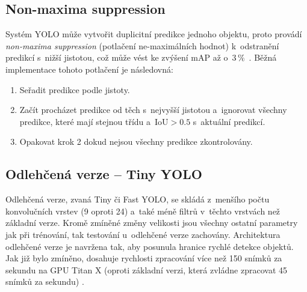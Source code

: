 \subsection*{Non-maxima suppression}
Systém YOLO může vytvořit duplicitní predikce jednoho objektu, proto provádí \emph{non-maxima suppression} (potlačení ne-maximálních hodnot) k~odstranění predikcí s~nižší jistotou, což může vést ke zvýšení mAP až o~$3\,\%$~\cite{yolov123}. Běžná implementace tohoto potlačení je následovná:

\begin{enumerate}
    \item Seřadit predikce podle jistoty.
    \item Začít procházet predikce od těch s~nejvyšší jistotou a~ignorovat všechny predikce, které mají stejnou třídu a~$\text{IoU} > 0.5$ s~aktuální predikcí.
    \item Opakovat krok 2 dokud nejsou všechny predikce zkontrolovány.
\end{enumerate}

\subsection*{Odlehčená verze -- Tiny YOLO}
\label{tinyToloTeorie}
Odlehčená verze, zvaná Tiny či Fast YOLO, se skládá z~menšího počtu konvolučních vrstev (9 oproti 24) a~také méně filtrů v~těchto vrstvách než základní verze. Kromě zmíněné změny velikosti jsou všechny ostatní parametry jak při trénování, tak testování u~odlehčené verze zachovány. Architektura odlehčené verze je navržena tak, aby posunula hranice rychlé detekce objektů. Jak již bylo zmíněno, dosahuje rychlosti zpracování více než 150 snímků za sekundu na GPU Titan X (oproti základní verzi, která zvládne zpracovat 45 snímků za sekundu) \cite{yolov1, yolov123}.


